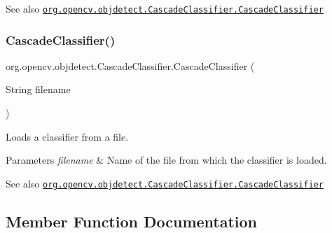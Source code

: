 \begin{DoxySeeAlso}{See also}
\href{http://docs.opencv.org/modules/objdetect/doc/cascade_classification.html#cascadeclassifier-cascadeclassifier}{\tt org.\+opencv.\+objdetect.\+Cascade\+Classifier.\+Cascade\+Classifier} 
\end{DoxySeeAlso}
\mbox{\label{classorg_1_1opencv_1_1objdetect_1_1_cascade_classifier_a5f2b38d9bebf5affc64c7db03abb94ce}} 
\subsubsection{\texorpdfstring{Cascade\+Classifier()}{CascadeClassifier()}\hspace{0.1cm}{\footnotesize\ttfamily [3/3]}}
{\footnotesize\ttfamily org.\+opencv.\+objdetect.\+Cascade\+Classifier.\+Cascade\+Classifier (\begin{DoxyParamCaption}\item[{String}]{filename }\end{DoxyParamCaption})}

Loads a classifier from a file.


\begin{DoxyParams}{Parameters}
{\em filename} & Name of the file from which the classifier is loaded.\\
\hline
\end{DoxyParams}
\begin{DoxySeeAlso}{See also}
\href{http://docs.opencv.org/modules/objdetect/doc/cascade_classification.html#cascadeclassifier-cascadeclassifier}{\tt org.\+opencv.\+objdetect.\+Cascade\+Classifier.\+Cascade\+Classifier} 
\end{DoxySeeAlso}


\subsection{Member Function Documentation}
\mbox{\label{classorg_1_1opencv_1_1objdetect_1_1_cascade_classifier_a9973e656c2fd194c81567349bc6be03e}} 
